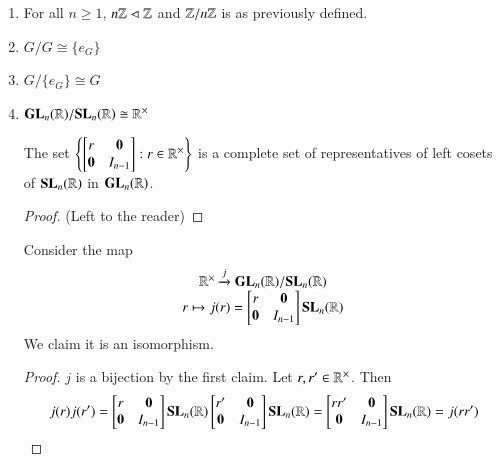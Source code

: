 \documentclass[12pt, a4paper, oneside, openright, titlepage]{book}
\begin{document}
\begin{eg}
        \leavevmode
        \begin{enumerate}
                \item For all $n \geq 1$, $n\mathbb Z \vartriangleleft \mathbb Z$ and $\mathbb Z/n\mathbb Z$ is as previously defined.
                \item $G/G \cong \{e_G\}$
                \item $G/\{e_G\} \cong G$
                \item $\mathbf{GL}_n(\mathbb R)/\mathbf{SL}_n(\mathbb R) \cong \mathbb R^{\times}$
                        \begin{claim}
                                The set $\left\{\begin{bmatrix} r & \mathbf{0} \\ \mathbf{0} & I_{n-1} \end{bmatrix} : r \in \mathbb R^{\times}\right\}$ is a complete set of representatives of left cosets of $\mathbf{SL}_n(\mathbb R)$ in $\mathbf{GL}_n(\mathbb R)$.
                        \end{claim}
                        \begin{proof}
                                (Left to the reader)
                        \end{proof}
                        Consider the map \begin{equation}
                                \begin{array}{c} \mathbb R^{\times}\xrightarrow{j} \mathbf{GL}_n(\mathbb R)/\mathbf{SL}_n(\mathbb R) \\ r\mapsto j(r) = \begin{bmatrix} r & \mathbf{0} \\ \mathbf{0} & I_{n-1} \end{bmatrix}\mathbf{SL}_n(\mathbb R) \end{array}
                        \end{equation}
                        We claim it is an isomorphism.
                        \begin{proof}
                                $j$ is a bijection by the first claim. Let $r,r' \in \mathbb R^{\times}$. Then \begin{equation}
                                        j(r)j(r') = \begin{bmatrix} r & \mathbf{0} \\ \mathbf{0} & I_{n-1} \end{bmatrix}\SL_n(\R)\begin{bmatrix} r' & \mathbf{0} \\ \mathbf{0} & I_{n-1} \end{bmatrix}\SL_n(\R) = \begin{bmatrix} rr' & \mathbf{0} \\ \mathbf{0} & I_{n-1} \end{bmatrix}\SL_n(\R) = j(rr')

\end{equation}
\end{proof}
\end{enumerate}
\end{eg}
\end{document}

